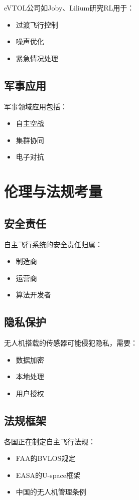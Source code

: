 eVTOL公司如Joby、Lilium研究RL用于：
\begin{itemize}
    \item 过渡飞行控制
    \item 噪声优化
    \item 紧急情况处理
\end{itemize}

\subsection{军事应用}

军事领域应用包括：
\begin{itemize}
    \item 自主空战
    \item 集群协同
    \item 电子对抗
\end{itemize}

\section{伦理与法规考量}\label{sec:ethics}

\subsection{安全责任}

自主飞行系统的安全责任归属：
\begin{itemize}
    \item 制造商
    \item 运营商
    \item 算法开发者
\end{itemize}

\subsection{隐私保护}

无人机搭载的传感器可能侵犯隐私，需要：
\begin{itemize}
    \item 数据加密
    \item 本地处理
    \item 用户授权
\end{itemize}

\subsection{法规框架}

各国正在制定自主飞行法规：
\begin{itemize}
    \item FAA的BVLOS规定
    \item EASA的U-space框架
    \item 中国的无人机管理条例
\end{itemize}

